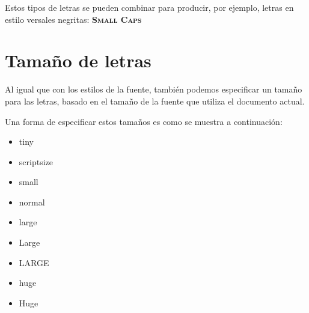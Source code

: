 \documentclass[letterpaper,11pt]{article}
\begin{document}
Estos tipos de letras se pueden combinar para producir, por ejemplo, letras en estilo versales negritas: \textbf{\textsc{Small Caps}}

\section{Tamaño de letras}

Al igual que con los estilos de la fuente, también podemos especificar un tamaño para las letras, basado en el tamaño de la fuente que utiliza el documento actual.

Una forma de especificar estos tamaños es como se muestra a continuación:

\begin{itemize}

\item {\tiny tiny}

\item {\scriptsize scriptsize}

\item {\small small}

\item {\normalsize normal}

\item {\large large}

\item {\Large Large}

\item {\LARGE LARGE}

\item {\huge huge}

\item {\Huge Huge}

\end{itemize}
\end{document}

